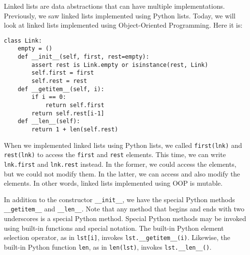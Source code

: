 Linked lists are data abstractions that can have multiple implementations. Previously, we saw linked lists implemented using Python lists. Today, we will look at linked lists implemented using Object-Oriented Programming. Here it is:
\begin{lstlisting}
class Link:
    empty = ()
    def __init__(self, first, rest=empty):
        assert rest is Link.empty or isinstance(rest, Link)
        self.first = first
        self.rest = rest
    def __getitem__(self, i):
        if i == 0:
            return self.first
        return self.rest[i-1]
    def __len__(self):
        return 1 + len(self.rest)
\end{lstlisting}
When we implemented linked lists using Python lists, we called \texttt{first(lnk)} and \texttt{rest(lnk)} to access the \texttt{first} and \texttt{rest} elements. This time, we can write \texttt{lnk.first} and \texttt{lnk.rest} instead. In the former, we could access the elements, but we could not modify them. In the latter, we can access and also modify the elements. In other words, linked lists implemented using OOP is mutable.

In addition to the constructor \texttt{\_\_init\_\_}, we have the special Python methods \texttt{\_\_getitem\_\_} and \texttt{\_\_len\_\_}. Note that any method that begins and ends with two underscores is a special Python method. Special Python methods may be invoked using built-in functions and special notation. The built-in Python element selection operator, as in \texttt{lst[i]}, invokes \texttt{lst.\_\_getitem\_\_(i)}. Likewise, the built-in Python function \texttt{len}, as in \texttt{len(lst)}, invokes \texttt{lst.\_\_len\_\_()}. 




